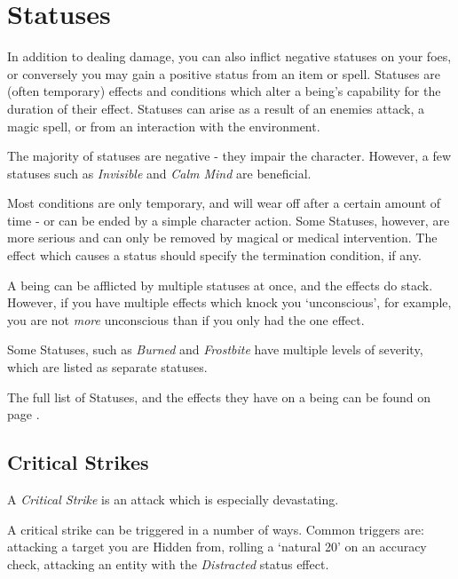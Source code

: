 



\section{Statuses}

In addition to dealing damage, you can also inflict negative statuses on your foes, or conversely you may gain a positive status from an item or spell. Statuses are (often temporary) effects and conditions which alter a being's capability for the duration of their effect. Statuses can arise as a result of an enemies attack, a magic spell, or from an interaction with the environment. 

The majority of statuses are negative - they impair the character. However, a few statuses such as {\it Invisible} and {\it Calm Mind} are beneficial. 

Most conditions are only temporary, and will wear off after a certain amount of time - or can be ended by a simple character action. Some Statuses, however, are more serious and can only be removed by magical or medical intervention. The effect which causes a status should specify the termination condition, if any. 

A being can be afflicted by multiple statuses at once, and the effects do stack. However, if you have multiple effects which knock you `unconscious', for example, you are not {\it more} unconscious than if you only had the one effect. 

Some Statuses, such as {\it Burned} and {\it Frostbite} have multiple levels of severity, which are listed as separate statuses.

The full list of Statuses, and the effects they have on a being can be found on page \pageref{S:StatusList}.


\subsection{Critical Strikes}\label{S:Sneak}

A {\it Critical Strike} is an attack which is especially devastating. 

A critical strike can be triggered in a number of ways. Common triggers are: attacking a target you are Hidden from, rolling a `natural 20' on an accuracy check, attacking an entity with the {\it Distracted} status effect. 

